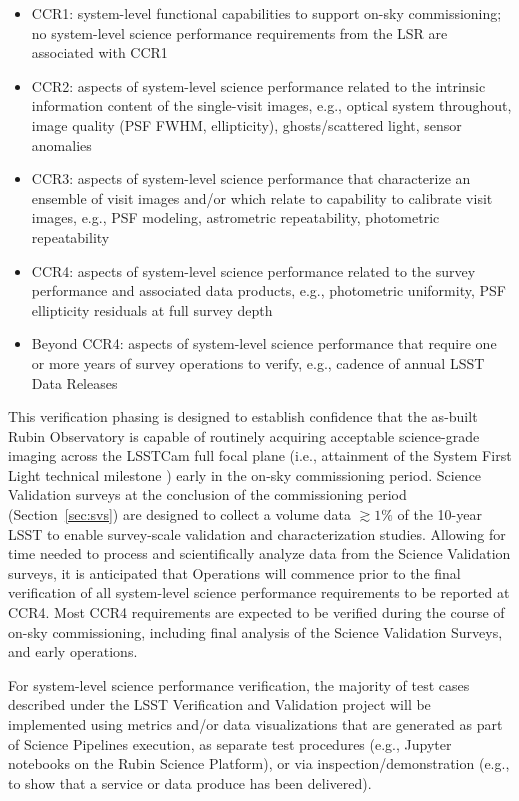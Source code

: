 \begin{itemize}
	\item CCR1: system-level functional capabilities to support on-sky commissioning; no system-level science performance requirements from the LSR are associated with CCR1
	\item CCR2: aspects of system-level science performance related to the intrinsic information content of the single-visit images, e.g., optical system throughout, image quality (PSF FWHM, ellipticity), ghosts/scattered light, sensor anomalies
	\item CCR3: aspects of system-level science performance that characterize an ensemble of visit images and/or which relate to capability to calibrate visit images, e.g., PSF modeling, astrometric repeatability, photometric repeatability
	\item CCR4: aspects of system-level science performance related to the survey performance and associated data products, e.g., photometric uniformity, PSF ellipticity residuals at full survey depth
	\item Beyond CCR4: aspects of system-level science performance that require one or more years of survey operations to verify, e.g., cadence of annual LSST Data Releases
\end{itemize}

This verification phasing is designed to establish confidence that the as-built Rubin Observatory is capable of routinely acquiring acceptable science-grade imaging across the LSSTCam full focal plane (i.e., attainment of the System First Light technical milestone ) early in the on-sky commissioning period.
Science Validation surveys at the conclusion of the commissioning period (Section~\ref{sec:svs}) are designed to collect a volume data $\gtrsim 1\%$ of the 10-year LSST to enable survey-scale validation and characterization studies.
Allowing for time needed to process and scientifically analyze data from the Science Validation surveys, it is anticipated that Operations will commence prior to the final verification of all system-level science performance requirements to be reported at CCR4.
Most CCR4 requirements are expected to be verified during the course of on-sky commissioning, including final analysis of the Science Validation Surveys, and early operations.

For system-level science performance verification, the majority of test cases described under the LSST Verification and Validation project will be implemented using metrics and/or data visualizations that are generated as part of Science Pipelines execution, as separate test procedures (e.g., Jupyter notebooks on the Rubin Science Platform), or via inspection/demonstration (e.g., to show that a service or data produce has been delivered).

